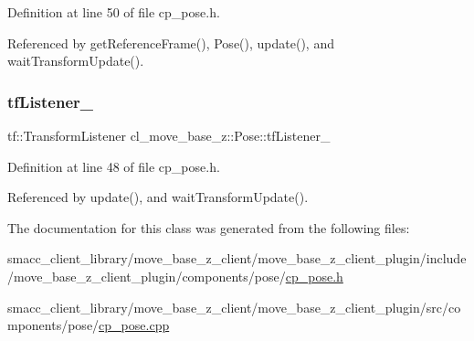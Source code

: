 Definition at line 50 of file cp\+\_\+pose.\+h.



Referenced by get\+Reference\+Frame(), Pose(), update(), and wait\+Transform\+Update().

\mbox{\label{classcl__move__base__z_1_1Pose_a6d669632db37e0e51734d2a65e8dcd41}} 
\subsubsection{\texorpdfstring{tf\+Listener\+\_\+}{tfListener\_}}
{\footnotesize\ttfamily tf\+::\+Transform\+Listener cl\+\_\+move\+\_\+base\+\_\+z\+::\+Pose\+::tf\+Listener\+\_\+\hspace{0.3cm}{\ttfamily [private]}}



Definition at line 48 of file cp\+\_\+pose.\+h.



Referenced by update(), and wait\+Transform\+Update().



The documentation for this class was generated from the following files\+:\begin{DoxyCompactItemize}
\item 
smacc\+\_\+client\+\_\+library/move\+\_\+base\+\_\+z\+\_\+client/move\+\_\+base\+\_\+z\+\_\+client\+\_\+plugin/include/move\+\_\+base\+\_\+z\+\_\+client\+\_\+plugin/components/pose/\hyperlink{cp__pose_8h}{cp\+\_\+pose.\+h}\item 
smacc\+\_\+client\+\_\+library/move\+\_\+base\+\_\+z\+\_\+client/move\+\_\+base\+\_\+z\+\_\+client\+\_\+plugin/src/components/pose/\hyperlink{cp__pose_8cpp}{cp\+\_\+pose.\+cpp}\end{DoxyCompactItemize}
